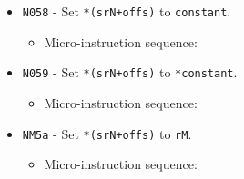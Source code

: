 \documentclass{article}
\def\specialtoaddr#1{\Verb|#1102| - output \Verb|sr#1| to addr bus}
\def\pkptrout{\Verb|0202| - output *\Verb|pk| to data bus}
\def\datatooffs{\Verb|4402| - write to \Verb|offs| from data bus}
\def\incrementpk{\Verb|0502| - increment \Verb|pk|}
\def\writeRAMo{\Verb|0104| - write data bus to *(addr bus+\Verb|offs|)}
\def\echodatalong{\Verb|0025| - echo data bus to itself for 3 cycles}
\def\done{\Verb|fffe| - end instruction}
\begin{document}
\begin{itemize}
    
    \item \Verb|N058| - Set \Verb|*(srN+offs)| to \Verb|constant|.
    \begin{itemize}
        \item Micro-instruction sequence:
    \end{itemize}
    
    \item \Verb|N059| - Set \Verb|*(srN+offs)| to \Verb|*constant|.
    \begin{itemize}
        \item Micro-instruction sequence:
    \end{itemize}
    
    \item \Verb|NM5a| - Set \Verb|*(srN+offs)| to \Verb|rM|.
    \begin{itemize}
        \item Micro-instruction sequence:
    \end{itemize}
    

\end{itemize}
\end{document}
